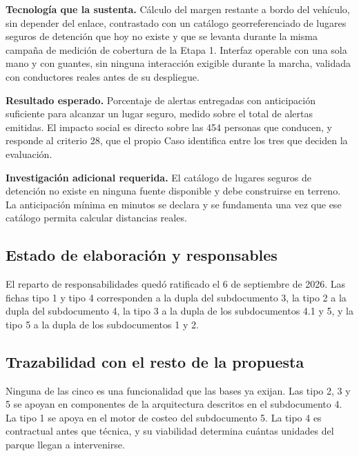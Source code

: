 \textbf{Tecnología que la sustenta.} Cálculo del margen restante a bordo del vehículo, sin depender
del enlace, contrastado con un catálogo georreferenciado de lugares seguros de detención que hoy no
existe y que se levanta durante la misma campaña de medición de cobertura de la Etapa 1. Interfaz
operable con una sola mano y con guantes, sin ninguna interacción exigible durante la marcha,
validada con conductores reales antes de su despliegue.

\textbf{Resultado esperado.} Porcentaje de alertas entregadas con anticipación suficiente para
alcanzar un lugar seguro, medido sobre el total de alertas emitidas. El impacto social es directo
sobre las 454 personas que conducen, y responde al criterio 28, que el propio Caso identifica entre
los tres que deciden la evaluación.

\textbf{Investigación adicional requerida.} El catálogo de lugares seguros de detención no existe
en ninguna fuente disponible y debe construirse en terreno. La anticipación mínima en minutos se
declara y se fundamenta una vez que ese catálogo permita calcular distancias reales.

\subsection{Estado de elaboración y responsables}

El reparto de responsabilidades quedó ratificado el 6 de septiembre de 2026. Las fichas tipo 1 y
tipo 4 corresponden a la dupla del subdocumento 3, la tipo 2 a la dupla del subdocumento 4, la tipo
3 a la dupla de los subdocumentos 4.1 y 5, y la tipo 5 a la dupla de los subdocumentos 1 y 2.

\subsection{Trazabilidad con el resto de la propuesta}

Ninguna de las cinco es una funcionalidad que las bases ya exijan. Las tipo 2, 3 y 5 se apoyan en
componentes de la arquitectura descritos en el subdocumento 4. La tipo 1 se apoya en el motor de
costeo del subdocumento 5. La tipo 4 es contractual antes que técnica, y su viabilidad determina
cuántas unidades del parque llegan a intervenirse.

